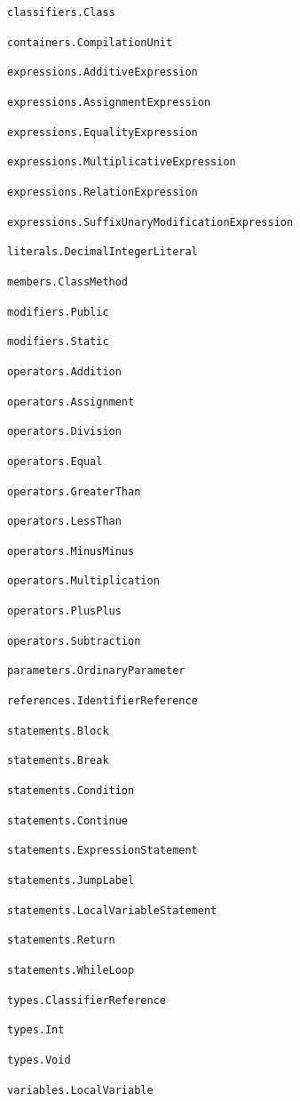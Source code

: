 \documentclass[10pt]{article}
\begin{document}
\begin{compactenum}
\item \verb|classifiers.Class|
\item \verb|containers.CompilationUnit|
\item \verb|expressions.AdditiveExpression|
\item \verb|expressions.AssignmentExpression|
\item \verb|expressions.EqualityExpression|
\item \verb|expressions.MultiplicativeExpression|
\item \verb|expressions.RelationExpression|
\item \verb|expressions.SuffixUnaryModificationExpression|
\item \verb|literals.DecimalIntegerLiteral|
\item \verb|members.ClassMethod|
\item \verb|modifiers.Public|
\item \verb|modifiers.Static|
\item \verb|operators.Addition|
\item \verb|operators.Assignment|
\item \verb|operators.Division|
\item \verb|operators.Equal|
\item \verb|operators.GreaterThan|
\item \verb|operators.LessThan|
\item \verb|operators.MinusMinus|
\item \verb|operators.Multiplication|
\item \verb|operators.PlusPlus|
\item \verb|operators.Subtraction|
\item \verb|parameters.OrdinaryParameter|
\item \verb|references.IdentifierReference|
\item \verb|statements.Block|
\item \verb|statements.Break|
\item \verb|statements.Condition|
\item \verb|statements.Continue|
\item \verb|statements.ExpressionStatement|
\item \verb|statements.JumpLabel|
\item \verb|statements.LocalVariableStatement|
\item \verb|statements.Return|
\item \verb|statements.WhileLoop|
\item \verb|types.ClassifierReference|
\item \verb|types.Int|
\item \verb|types.Void|
\item \verb|variables.LocalVariable|
\end{compactenum}
\end{document}
